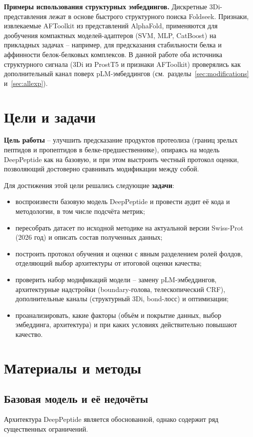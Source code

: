 \documentclass{article}
\begin{document}
\textbf{Примеры использования структурных эмбеддингов.} Дискретные 3Di-представления лежат в основе быстрого структурного поиска Foldseek. Признаки, извлекаемые AFToolkit из представлений AlphaFold, применяются для дообучения компактных моделей-адаптеров (SVM, MLP, CatBoost) на прикладных задачах -- например, для предсказания стабильности белка и аффинности белок-белковых комплексов. В данной работе оба источника структурного сигнала (3Di из ProstT5 и признаки AFToolkit) проверялись как дополнительный канал поверх pLM-эмбеддингов (см.\ разделы~\ref{sec:modifications} и~\ref{sec:allexp}).

\section{Цели и задачи}
\textbf{Цель работы} -- улучшить предсказание продуктов протеолиза (границ зрелых пептидов и пропептидов в белке-предшественнике), опираясь на модель DeepPeptide как на базовую, и при этом выстроить честный протокол оценки, позволяющий достоверно сравнивать модификации между собой.

Для достижения этой цели решались следующие \textbf{задачи}:
\begin{itemize}
  \item воспроизвести базовую модель DeepPeptide и провести аудит её кода и методологии, в том числе подсчёта метрик;
  \item пересобрать датасет по исходной методике на актуальной версии Swiss-Prot (2026 год) и описать состав полученных данных;
  \item построить протокол обучения и оценки с явным разделением ролей фолдов, отделяющий выбор архитектуры от итоговой оценки качества;
  \item проверить набор модификаций модели -- замену pLM-эмбеддингов, архитектурные надстройки (boundary-голова, телескопический CRF), дополнительные каналы (структурный 3Di, bond-лосс) и оптимизации;
  \item проанализировать, какие факторы (объём и покрытие данных, выбор эмбеддинга, архитектура) и при каких условиях действительно повышают качество.
\end{itemize}


\section{Материалы и методы}
\subsection{Базовая модель и её недочёты}
Архитектура DeepPeptide является обоснованной, однако содержит ряд существенных ограничений.
\end{document}
